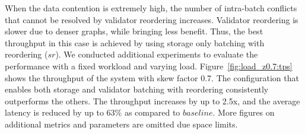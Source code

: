 When the data contention is extremely high, the number of intra-batch conflicts
that cannot be resolved by validator reordering increases. Validator reordering
is slower due to denser graphs, while bringing less benefit. Thus, the best throughput in this case is achieved by using storage only batching with reordering ($sr$). 
We conducted additional experiments to evaluate the performance with a fixed workload and varying load. Figure~\ref{fig:load_z0.7:tps} shows the throughput of the system with skew factor 0.7. The configuration that enables both storage and validator batching with reordering consistently outperforms the others. The throughput increases by up to 2.5x, and the average latency is reduced by up to 63\% as compared to $baseline$. More figures on additional metrics and parameters are omitted due space limits.


